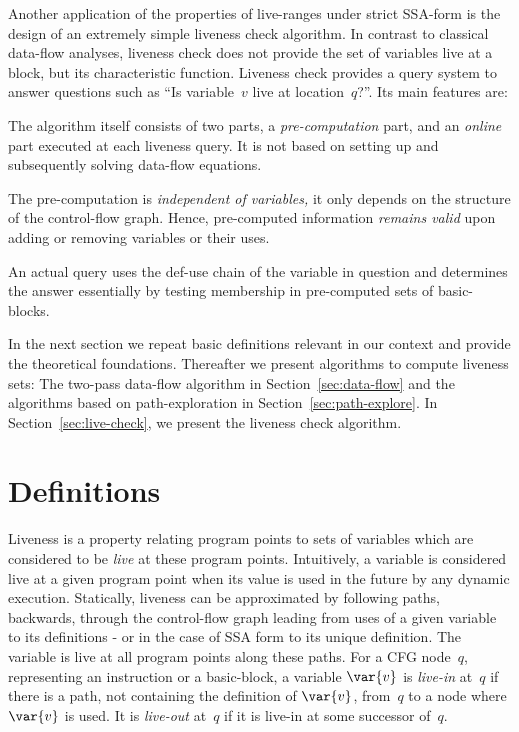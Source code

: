Another application of the properties of live-ranges under strict SSA-form is the design of an extremely simple liveness check algorithm.
In contrast to classical data-flow analyses, liveness check does not provide the set of variables live at a block, but its characteristic function.
Liveness check provides a query system to answer questions such as ``Is variable~$v$ live at location~$q$?''.
Its main features are:
\begin{compactenum}
\item
	The algorithm itself consists of two parts, a \emph{pre-computation} part, and an \emph{online} part executed at each liveness query.
	It is not based on setting up and subsequently solving data-flow equations.
\item
	The pre-computation is \emph{independent of variables,} it only depends on the structure of the control-flow graph.
	Hence, pre-computed information \emph{remains valid} upon adding or removing variables or their uses.
\item
	An actual query uses the def-use chain of the variable in question and determines the answer essentially by testing membership in pre-computed sets of basic-blocks.
\end{compactenum}

In the next section we repeat basic definitions relevant in our context and provide the theoretical foundations.
Thereafter we present algorithms to compute liveness sets:
The two-pass data-flow algorithm in Section~\ref{sec:data-flow} and the algorithms based on path-exploration in Section~\ref{sec:path-explore}.
In Section~\ref{sec:live-check}, we present the liveness check algorithm.


\section{Definitions}
Liveness is a property relating program points to sets of variables which are considered to be \emph{live} at these program points.
Intuitively, a variable is considered live at a given program point when its value is used in the future by any dynamic execution.
Statically, liveness can be approximated by following paths, backwards, through the control-flow graph leading from uses of a given variable to its definitions - or in the case of SSA form to its unique definition.
The variable is live at all program points along these paths.
For a CFG node~$q$, representing an instruction or a basic-block, a variable $\var{v}$ is \emph{live-in} at~$q$ if there is a path, not containing the definition of $\var{v}$, from~$q$ to a node where $\var{v}$ is used.
It is \emph{live-out} at~$q$ if it is live-in at some successor of~$q$.

